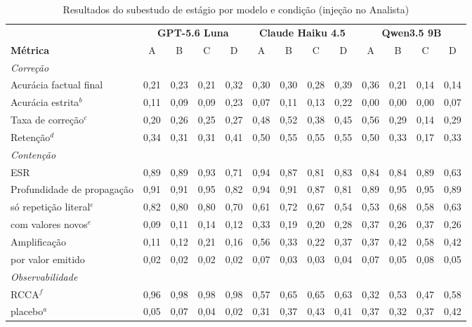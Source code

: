 \begin{table}[t]
\caption{Resultados do subestudo de estágio por modelo e condição (injeção no Analista)}
\label{tab:subestudo}
\centering
\footnotesize
\setlength{\tabcolsep}{3.2pt}
\begin{tabular}{|l|cccc|cccc|cccc|}
\hline
 & \multicolumn{4}{c|}{\textbf{GPT-5.6 Luna}} & \multicolumn{4}{c|}{\textbf{Claude Haiku 4.5}} & \multicolumn{4}{c|}{\textbf{Qwen3.5 9B}} \\
\textbf{Métrica} & A & B & C & D & A & B & C & D & A & B & C & D \\
\hline
\multicolumn{13}{|l|}{\textit{Correção}} \\
Acurácia factual final & 0,21 & 0,23 & 0,21 & 0,32 & 0,30 & 0,30 & 0,28 & 0,39 & 0,36 & 0,21 & 0,14 & 0,14 \\
Acurácia estrita$^{b}$ & 0,11 & 0,09 & 0,09 & 0,23 & 0,07 & 0,11 & 0,13 & 0,22 & 0,00 & 0,00 & 0,00 & 0,07 \\
Taxa de correção$^{c}$ & 0,20 & 0,26 & 0,25 & 0,27 & 0,48 & 0,52 & 0,38 & 0,45 & 0,56 & 0,29 & 0,14 & 0,29 \\
Retenção$^{d}$ & 0,34 & 0,31 & 0,31 & 0,41 & 0,50 & 0,55 & 0,55 & 0,55 & 0,50 & 0,33 & 0,17 & 0,33 \\
\multicolumn{13}{|l|}{\textit{Contenção}} \\
ESR & 0,89 & 0,89 & 0,93 & 0,71 & 0,94 & 0,87 & 0,81 & 0,83 & 0,84 & 0,84 & 0,89 & 0,63 \\
Profundidade de propagação & 0,91 & 0,91 & 0,95 & 0,82 & 0,94 & 0,91 & 0,87 & 0,81 & 0,89 & 0,95 & 0,95 & 0,89 \\
\quad só repetição literal$^{e}$ & 0,82 & 0,80 & 0,80 & 0,70 & 0,61 & 0,72 & 0,67 & 0,54 & 0,53 & 0,68 & 0,58 & 0,63 \\
\quad com valores novos$^{e}$ & 0,09 & 0,11 & 0,14 & 0,12 & 0,33 & 0,19 & 0,20 & 0,28 & 0,37 & 0,26 & 0,37 & 0,26 \\
Amplificação & 0,11 & 0,12 & 0,21 & 0,16 & 0,56 & 0,33 & 0,22 & 0,37 & 0,37 & 0,42 & 0,58 & 0,42 \\
\quad por valor emitido & 0,02 & 0,02 & 0,02 & 0,02 & 0,07 & 0,03 & 0,03 & 0,04 & 0,07 & 0,05 & 0,08 & 0,05 \\
\multicolumn{13}{|l|}{\textit{Observabilidade}} \\
RCCA$^{f}$ & 0,96 & 0,98 & 0,98 & 0,98 & 0,57 & 0,65 & 0,65 & 0,63 & 0,32 & 0,53 & 0,47 & 0,58 \\
\quad placebo$^{a}$ & 0,05 & 0,07 & 0,04 & 0,02 & 0,31 & 0,37 & 0,43 & 0,41 & 0,37 & 0,32 & 0,37 & 0,42 \\

\end{tabular}
\end{table}
